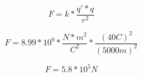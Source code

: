 \documentclass[11pt]{article}
\begin{document}
	\begin{equation}
		F = k * \frac{q'*q}{r^2}
	\end{equation}
	
	\begin{equation}
		F = 8.99 * 10^9*\frac{N*m^2}{C^2}*\frac{(40C)^2}{(5000m)^2}
	\end{equation}
	
	\begin{equation}
		F = 5.8 * 10^5 N
	\end{equation}
\end{document}
